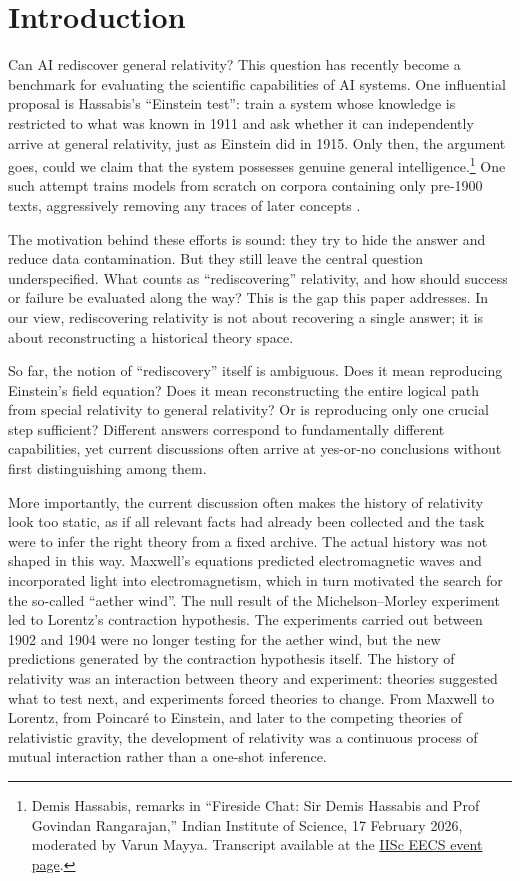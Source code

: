 \documentclass{article}
\begin{document}
\section{Introduction}
Can AI rediscover general relativity? This question has recently become a benchmark for evaluating the scientific capabilities of AI systems. One influential proposal is Hassabis's ``Einstein test'': train a system whose knowledge is restricted to what was known in 1911 and ask whether it can independently arrive at general relativity, just as Einstein did in 1915. Only then, the argument goes, could we claim that the system possesses genuine general intelligence.\footnote{Demis Hassabis, remarks in ``Fireside Chat: Sir Demis Hassabis and Prof Govindan Rangarajan,'' Indian Institute of Science, 17 February 2026, moderated by Varun Mayya. Transcript available at the \href{https://eecs.iisc.ac.in/fireside-chat-sir-demis-hassabis-and-prof-govindan-rangarajan/}{IISc EECS event page}.} One such attempt trains models from scratch on corpora containing only pre-1900 texts, aggressively removing any traces of later concepts \citep{hla2026machina}.

The motivation behind these efforts is sound: they try to hide the answer and reduce data contamination. But they still leave the central question underspecified. What counts as ``rediscovering'' relativity, and how should success or failure be evaluated along the way? This is the gap this paper addresses. In our view, rediscovering relativity is not about recovering a single answer; it is about reconstructing a historical theory space.

So far, the notion of ``rediscovery'' itself is ambiguous. Does it mean reproducing Einstein's field equation? Does it mean reconstructing the entire logical path from special relativity to general relativity? Or is reproducing only one crucial step sufficient? Different answers correspond to fundamentally different capabilities, yet current discussions often arrive at yes-or-no conclusions without first distinguishing among them.

More importantly, the current discussion often makes the history of relativity look too static, as if all relevant facts had already been collected and the task were to infer the right theory from a fixed archive. The actual history was not shaped in this way. Maxwell's equations predicted electromagnetic waves and incorporated light into electromagnetism, which in turn motivated the search for the so-called ``aether wind''. The null result of the Michelson--Morley experiment led to Lorentz's contraction hypothesis. The experiments carried out between 1902 and 1904 were no longer testing for the aether wind, but the new predictions generated by the contraction hypothesis itself. The history of relativity was an interaction between theory and experiment: theories suggested what to test next, and experiments forced theories to change.
From Maxwell to Lorentz, from Poincaré to Einstein, and later to the competing theories of relativistic gravity, the development of relativity was a continuous process of mutual interaction rather than a one-shot inference.
\end{document}
